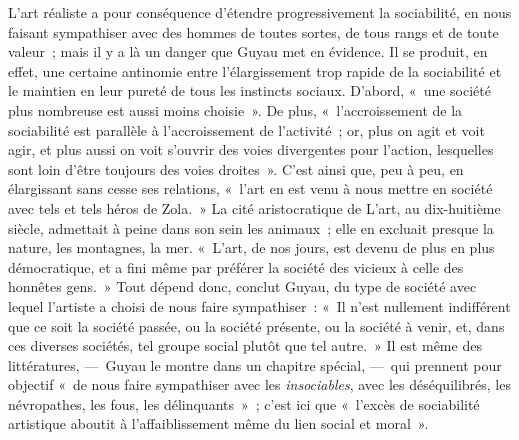 \documentclass[french,twoside]{book} %
\begin{document}
L’art réaliste a pour conséquence d’étendre progressivement la sociabilité, en nous faisant sympathiser avec des hommes de toutes sortes, de tous rangs et de toute valeur ; mais il y a là un danger que Guyau met en évidence. Il se produit, en effet, une certaine antinomie entre l’élargissement trop rapide de la sociabilité et le maintien en leur pureté de tous les instincts sociaux. D’abord, « une société plus nombreuse est aussi moins choisie ». De plus, « l’accroissement de la sociabilité est parallèle à l’accroissement de l’activité ; or, plus on agit et voit agir, et plus aussi on voit s’ouvrir des voies divergentes pour l’action, lesquelles sont loin d’être toujours des voies droites ». C’est ainsi que, peu à peu, en élargissant sans cesse ses relations, « l’art en est venu à nous mettre en société avec tels et tels héros de Zola. » La cité aristocratique de L’art, au dix-huitième siècle, admettait à peine dans son sein les animaux ; elle en excluait presque la nature, les montagnes, la mer. « L’art, de nos jours, est devenu de plus en plus démocratique, et a fini même par préférer la société des vicieux à celle des honnêtes gens. » Tout dépend donc, conclut Guyau, du type de société avec lequel l’artiste a choisi de nous faire sympathiser : « Il n’est nullement indifférent que ce soit la société passée, ou la société présente, ou la société à venir, et, dans ces diverses sociétés, tel groupe social plutôt que tel autre. » Il est même des littératures, — Guyau le montre dans un chapitre spécial, — qui prennent pour objectif « de nous faire sympathiser avec les \emph{insociables}, avec les déséquilibrés, les névropathes, les fous, les délinquants » ; c’est ici que « l’excès de sociabilité artistique aboutit à l’affaiblissement même du lien social et moral ».\par
\end{document}
